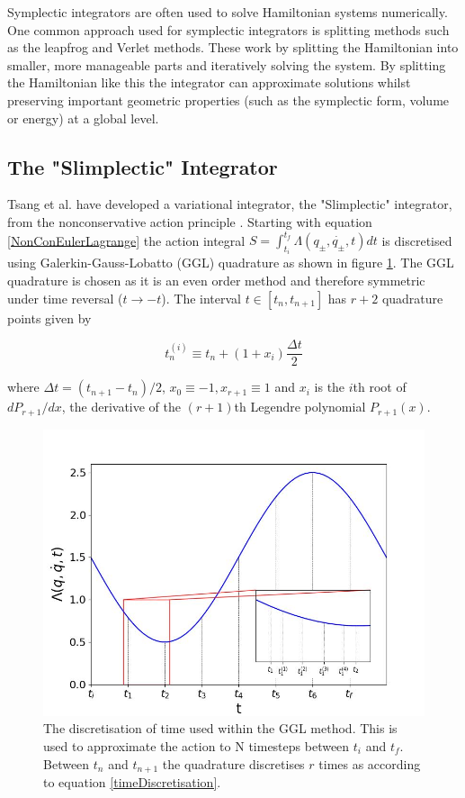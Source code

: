 \documentclass[10pt]{iopart}
\begin{document}
Symplectic integrators are often used to solve Hamiltonian systems numerically. One common approach used for symplectic integrators is splitting methods such as the leapfrog and Verlet \cite{Verlet} methods. These work by splitting the Hamiltonian into smaller, more manageable parts and iteratively solving the system. By splitting the Hamiltonian like this the integrator can approximate solutions whilst preserving important geometric properties (such as the symplectic form, volume or energy) at a global level.

\subsection{The "Slimplectic" Integrator \\}
Tsang et al. \cite{Tsang_Slimplectic} have developed a variational integrator, the "Slimplectic" integrator, from the nonconservative action principle \cite{GalleyEtAl}. Starting with equation \ref{NonConEulerLagrange} the action integral $S = \int_{t_i}^{t_f}\Lambda(q_{\pm},\dot{q_{\pm}},t)dt$ is discretised using Galerkin-Gauss-Lobatto (GGL) quadrature \cite{GGL} as shown in figure \ref{GGLDiscretisation}. The GGL quadrature is chosen as it is an even order method and therefore symmetric under time reversal ($t\to-t$). The interval $t\in [t_n, t_{n+1}]$ has $r+2$ quadrature points given by

\begin{equation}
\label{timeDiscretisation}
	t_n^{(i)} \equiv t_n + (1+x_i)\frac{\Delta t}{2}
\end{equation}

where $\Delta t = (t_{n+1}-t_n)/2$, $x_0 \equiv -1, x_{r+1} \equiv 1$ and $x_i$ is the $i$th root of $dP_{r+1}/dx$, the derivative of the $(r+1)$th Legendre polynomial $P_{r+1}(x)$. 

\begin{figure}
	\centering
	\label{GGLDiscretisation}
	\includegraphics[width =\columnwidth]{cartoon.jpg}
	\caption{The discretisation of time used within the GGL method. This is used to approximate the action to N timesteps between $t_i$ and $t_f$. Between $t_n$ and $t_{n+1}$ the quadrature discretises $r$ times as according to equation \ref{timeDiscretisation}.}
\end{figure}
\end{document}
